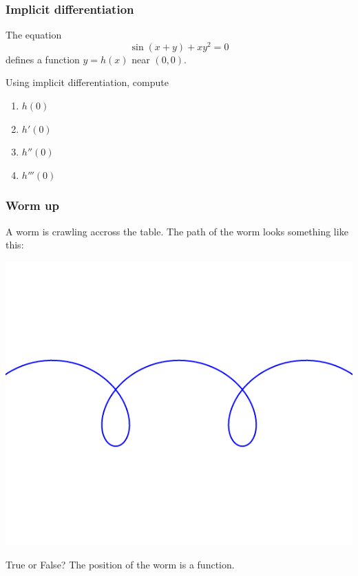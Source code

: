 \documentclass[14pt]{beamer}
\begin{document}
\begin{frame}[t]
	\frametitle{Implicit differentiation}

	The equation
	\[
		\sin (x+y) + xy^{2}= 0
	\]
	defines a function $\displaystyle y=h(x)$ near $(0,0)$. \href{https://www.desmos.com/calculator/bvupq00r6s}{}

	Using implicit differentiation, compute
	\begin{multicols}{4}
		\begin{enumerate}
			\item $\displaystyle h(0)$

			\item $\displaystyle h'(0)$

			\item $\displaystyle h''(0)$

			\item $\displaystyle h'''(0)$
		\end{enumerate}
	\end{multicols}
\end{frame}

\begin{frame}[t]
	\frametitle{Worm up}


	A worm is crawling accross the table. The path of the worm looks something
	like this:


	\begin{center}
		\includegraphics[scale=.3]{G11}
	\end{center}

	\vspace{-1cm}

	\begin{block}{True or False?}
		The position of the worm is a function.
	\end{block}
\end{frame}
\end{document}
